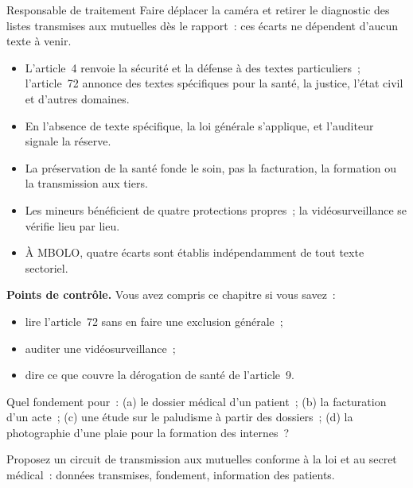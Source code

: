 \begin{boxmetier}{Responsable de traitement}
Faire déplacer la caméra et retirer le diagnostic des listes transmises
aux mutuelles dès le rapport~: ces écarts ne dépendent d'aucun texte à
venir.
\end{boxmetier}

\begin{boxresume}
\begin{itemize}
    \item L'article~4 renvoie la sécurité et la défense à des textes
          particuliers~; l'article~72 annonce des textes spécifiques pour la
          santé, la justice, l'état civil et d'autres domaines.
    \item En l'absence de texte spécifique, la loi générale s'applique, et
          l'auditeur signale la réserve.
    \item La préservation de la santé fonde le soin, pas la facturation, la
          formation ou la transmission aux tiers.
    \item Les mineurs bénéficient de quatre protections propres~; la
          vidéosurveillance se vérifie lieu par lieu.
    \item À MBOLO, quatre écarts sont établis indépendamment de tout texte
          sectoriel.
\end{itemize}
\end{boxresume}

\begin{boxinfo}
\textbf{Points de contrôle.} Vous avez compris ce chapitre si vous savez~:
\begin{itemize}
    \item lire l'article~72 sans en faire une exclusion générale~;
    \item auditer une vidéosurveillance~;
    \item dire ce que couvre la dérogation de santé de l'article~9.
\end{itemize}
\end{boxinfo}

\begin{boxexo}[title={\ding{45}\quad Exercice~15.1. Quel fondement \niveaubase}]
Quel fondement pour~: (a) le dossier médical d'un patient~; (b) la
facturation d'un acte~; (c) une étude sur le paludisme à partir des
dossiers~; (d) la photographie d'une plaie pour la formation des
internes~?
\end{boxexo}

\begin{boxexo}[title={\ding{45}\quad Exercice~15.2. Les mutuelles \niveaumoyen}]
Proposez un circuit de transmission aux mutuelles conforme à la loi et au
secret médical~: données transmises, fondement, information des patients.
\end{boxexo}

